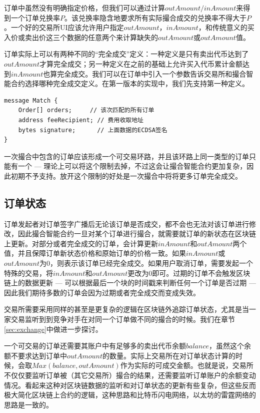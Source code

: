 \documentclass[UTF8,nofonts]{ctexart}
\begin{document}
订单中虽然没有明确指定价格，但我们可以通过计算$outAmount/inAmount$来得到一个订单兑换率$P$。该兑换率隐含地要求所有实际撮合成交的兑换率不得大于$P$。一个好的交易所UI应该允许用户指定$outAmount$，$inAmount$，和传统意义的买入价或卖出价这三个数据的任意两个来计算缺失的$outAmount$或$outAmount$值。

订单实际上可以有两种不同的“完全成交”定义：一种定义是只有卖出代币达到了$outAmount$才算完全成交；另一种定义在之前的基础上允许买入代币累计金额达到$inAmount$也算完全成交。我们可以在订单中引入一个参数告诉交易所和撮合智能合约选择哪种完全成交定义。在第一版本的实现中，我们先支持第一种定义。

\begin{verbatim}
message Match {
    Order[] orders;     // 该次匹配的所有订单
    address feeRecipient; // 费用收取地址
    bytes signature;      // 上面数据的ECDSA签名
}
\end{verbatim}

一次撮合中包含的订单应该形成一个可交易环路，并且该环路上同一类型的订单只能有一个 --- 理论上可以将这个限制去掉，不过这会让撮合智能合约更加复杂，因此初期不予支持。放开这个限制的好处是一次撮合中将将更多订单完全成交。

\subsection{订单状态\label{sec:orderstate}}

订单发起者对订单签字广播后无论该订单是否成交，都不会也无法对该订单进行修改，因此撮合智能合约一旦对某个订单进行撮合，就需要就订单的新状态在区块链上更新。对部分或者完全成交的订单，会计算更新$inAmount$和$outAmount$两个值，并且保障订单新状态价格和原始订单的价格一致。如果$inAmount$或$outAmount$为0，则表示该订单已经完全成交。如果用户取消订单，需要发起一个特殊的交易，将$inAmount$和$outAmount$更改为0即可。过期的订单不会触发区块链上的数据更新 --- 可以根据最后一个块的时间戳来判断任何一个订单是否过期 --- 因此我们期待多数的订单会因为过期或者完全成交而变成失效。

交易所需要采用同样的甚至是更复杂的逻辑在区块链外追踪订单状态，尤其是当一家交易监听到到竞争对手在对同一个订单做不同的撮合的时候。我们在章节\ref{sec:exchange}中做进一步探讨。

一个可交易的订单还需要其账户中有足够多的卖出代币余额$balance$，虽然这个余额不要求达到订单中$outAmount$的数量。实际上交易所在对订单状态计算的时候，会取$Max(balance, outAmount)$作为实际的可成交金额。也就是说，交易所不仅仅要监听订单被（其它交易所）撮合的结果，还需要监听订单账户的余额变动情况。看起来这种对区块链数据的监听和对订单状态的更新有些复杂，但这些反而极大简化区块链上合约的逻辑，这种思路和比特币闪电网络，以太坊的雷霆网络的思路是一致的。
\end{document}
